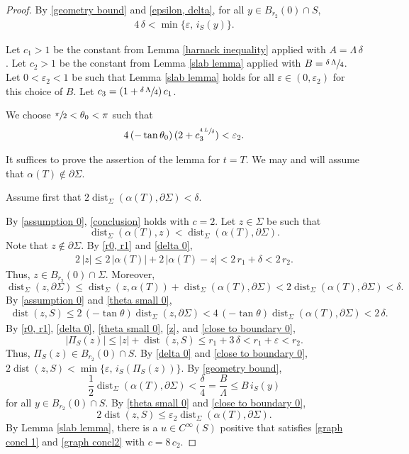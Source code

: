 \documentclass[11pt]{amsart}
\begin{document}
	\begin{proof}
By \eqref{geometry bound} and \eqref{epsilon, delta},		 for all $y\in B_{r_2}(0)\cap S$,
		\begin{align} \label{delta 0}
			4\,\delta < \min\{\varepsilon,\,i_S(y)\}.
		\end{align}
		
		Let  $c_1>1$ be the constant from Lemma \ref{harnack inequality} applied with $A=\Lambda\,\delta$. 	Let  $c_2>1$ be the constant from Lemma \ref{slab lemma} applied with $B=\sfrac{\delta\,\Lambda}{4}$. Let $0<\varepsilon_2<1$ be such that Lemma \ref{slab lemma} holds for all $\varepsilon\in(0,\varepsilon_2)$ for this choice of $B$. Let $c_3=(1+\sfrac{\delta\,\Lambda}{4})\,c_1$.
		
		We choose  $\sfrac{\pi}2<\theta_0<\pi$ such that 
				\begin{align}  
			\label{theta small 0}
			4\,(-\tan\theta_0)\,(2+c_3^{\sfrac{4\,L}{\delta}})<\varepsilon_2.		
		\end{align}	
		
		It suffices to prove the assertion of the lemma for $t=T$. We may and will assume that $\alpha(T)\notin \partial \Sigma$.
			
		Assume first that $2\operatorname{dist}_\Sigma(\alpha(T),\partial \Sigma)< \delta$. 
		
		By \eqref{assumption 0}, \eqref{conclusion} holds with $c=2$.  Let $z\in \Sigma$ be such that
		$$
		\operatorname{dist}_\Sigma(\alpha(T),z)<\operatorname{dist}_\Sigma(\alpha(T),\partial \Sigma).
		$$ 
		 Note that $z\notin \partial \Sigma$. By \eqref{r0, r1} and \eqref{delta 0}, \begin{align} \label{z} 2\,|z|\leq 2\,|\alpha(T)|+2\,|\alpha(T)-z|<2\,r_1+\delta<2\, r_2.\end{align}
Thus, $z\in B_{r_2}(0)\cap \Sigma$. Moreover,	
		 $$
		 \operatorname{dist}_\Sigma(z,\partial \Sigma)\leq  \operatorname{dist}_\Sigma(z,\alpha(T))+ \operatorname{dist}_\Sigma(\alpha(T),\partial \Sigma)<2\operatorname{dist}_\Sigma(\alpha(T),\partial \Sigma)<\delta.
		 $$
		By \eqref{assumption 0} and \eqref{theta small 0}, 
		\begin{align} \label{close to boundary 0} 
		\operatorname{dist}(z,S)\leq 2\,(-\tan\theta)\operatorname{dist}_\Sigma(z,\partial \Sigma)<4\,(-\tan\theta)\operatorname{dist}_\Sigma(\alpha(T),\partial \Sigma)<2\,\delta.
		\end{align} 
		By \eqref{r0, r1}, \eqref{delta 0},  \eqref{theta small 0}, \eqref{z}, and \eqref{close to boundary 0}, 
		$$
		|\Pi_S(z)|\leq |z|+\operatorname{dist}(z,S)\leq r_1+3\,\delta<r_1+\varepsilon<r_2.
		$$
		Thus, $\Pi_S(z)\in B_{r_2}(0)\cap S$.
	By \eqref{delta 0}  and \eqref{close to boundary 0},  $2\operatorname{dist}(z,S)< \min\{\varepsilon,\,i_S(\Pi_S(z))\}$. By \eqref{geometry bound},
		$$
		\frac12\operatorname{dist}_\Sigma(\alpha(T),\partial \Sigma)<\frac{\delta}4=\frac{B}{\Lambda}\leq B\,i_S(y)
		$$
		for all $y\in B_{r_2}(0)\cap S$. By \eqref{theta small 0} and \eqref{close to boundary 0},  $$2\operatorname{dist}(z,S)\leq\varepsilon_2\operatorname{dist}_\Sigma(\alpha(T),\partial \Sigma).$$
		By Lemma \ref{slab lemma}, there is a  $u\in C^\infty(S)$ positive that satisfies \eqref{graph concl 1} and \eqref{graph concl2} with $c=8\,c_2$.
		

\end{proof}
\end{document}
